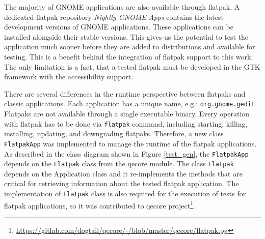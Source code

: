 The majority of GNOME applications are also available through flatpak. A dedicated flatpak repository \textit{Nightly GNOME Apps} contains the latest development versions of GNOME applications. These applications can be installed alongside their stable versions. This gives us the potential to test the application much sooner before they are added to distributions and available for testing. This is a benefit behind the integration of flatpak support to this work. The only limitation is a fact, that a tested flatpak must be developed in the GTK framework with the accessibility support. 

There are several differences in the runtime perspective between flatpaks and classic applications. Each application has a unique name, e.g.: \texttt{org.gnome.gedit}. Flatpaks are not available through a single executable binary. Every operation with flatpak has to be done via \texttt{flatpak} command, including starting, killing, installing, updating, and downgrading flatpaks. Therefore, a new class \texttt{FlatpakApp} was implemented to manage the runtime of the flatpak applications. As described in the class diagram shown in Figure \ref{test_gen}, the \texttt{FlatpakApp} depends on the \texttt{Flatpak} class from the qecore module. The class \texttt{Flatpak} depends on the {Application} class and it re-implements the methods that are critical for retrieving information about the tested flatpak application. The implementation of \texttt{Flatpak} class is also required for the execution of tests for flatpak applications, so it was contributed to qecore project\footnote{\url{https://gitlab.com/dogtail/qecore/-/blob/master/qecore/flatpak.py}}.

